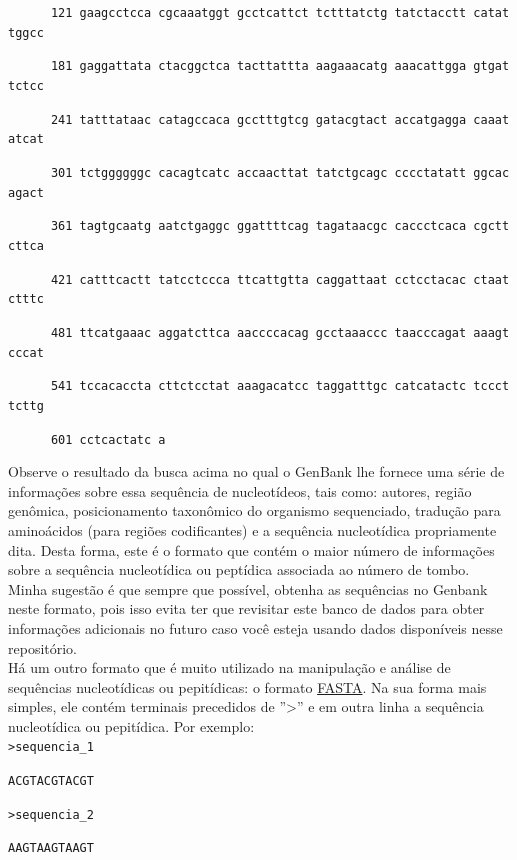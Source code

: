 \begin{refsection}
\noindent\texttt{~~~~~~121~gaagcctcca~cgcaaatggt~gcctcattct~tctttatctg~tatctacctt~catattggcc}

\noindent\texttt{~~~~~~181~gaggattata~ctacggctca~tacttattta~aagaaacatg~aaacattgga~gtgattctcc}

\noindent\texttt{~~~~~~241~tatttataac~catagccaca~gcctttgtcg~gatacgtact~accatgagga~caaatatcat}

\noindent\texttt{~~~~~~301~tctggggggc~cacagtcatc~accaacttat~tatctgcagc~cccctatatt~ggcacagact}

\noindent\texttt{~~~~~~361~tagtgcaatg~aatctgaggc~ggattttcag~tagataacgc~caccctcaca~cgcttcttca}

\noindent\texttt{~~~~~~421~catttcactt~tatcctccca~ttcattgtta~caggattaat~cctcctacac~ctaatctttc}

\noindent\texttt{~~~~~~481~ttcatgaaac~aggatcttca~aaccccacag~gcctaaaccc~taacccagat~aaagtcccat}

\noindent\texttt{~~~~~~541~tccacaccta~cttctcctat~aaagacatcc~taggatttgc~catcatactc~tcccttcttg}

\noindent\texttt{~~~~~~601~cctcactatc~a}
\normalsize

Observe o resultado da busca acima no qual o GenBank lhe fornece uma série de informações sobre essa sequência de nucleotídeos, tais como: autores, região genômica, posicionamento taxonômico do organismo sequenciado, tradução para aminoácidos (para regiões codificantes) e a sequência nucleotídica propriamente dita. Desta forma, este é o formato que contém o maior número de informações sobre a sequência nucleotídica ou peptídica associada ao número de tombo. Minha sugestão é que sempre que possível, obtenha as sequências no Genbank neste formato, pois isso evita ter que revisitar este banco de dados para obter informações adicionais no futuro caso você esteja usando dados disponíveis nesse repositório.\\

Há um outro formato que é muito utilizado na manipulação e análise de sequências nucleotídicas ou pepitídicas: o formato \href{http://pt.wikipedia.org/wiki/Formato\_FASTA}{FASTA}. Na sua forma mais simples, ele contém terminais precedidos de ''>'' e em outra linha a sequência nucleotídica ou pepitídica. Por exemplo:\\

\scriptsize
\noindent\texttt{>sequencia\_1}

\noindent\texttt{ACGTACGTACGT}

\noindent\texttt{>sequencia\_2}

\noindent\texttt{AAGTAAGTAAGT}


\end{refsection}
